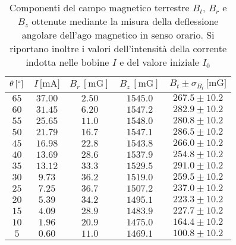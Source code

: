 \documentclass[]{article}
\begin{document}
\begin{table}
    \centering


\begin{tabular}{||c|c|c|c|c||}
    \hline
    $\theta\, [\text{\degree}] $ & $I\, \text{[mA]} $ & $B_r\, [\text{mG}] $ & $B_z\, [\text{mG}] $ & $B_t \pm \sigma_{B_t}\, \text{[mG]} $\\
    \hline\hline

    $65$ & $37.00$ & $2.50$ & $1545.0$ & $267.5 \pm 10.2$ \\\hline
    $60$ & $31.45$ & $6.20$ & $1547.2$ & $282.9 \pm 10.2$ \\\hline
    $55$ & $25.65$ & $11.0$ & $1548.0$ & $280.8 \pm 10.2$ \\\hline
    $50$ & $21.79$ & $16.7$ & $1547.1$ & $286.5 \pm 10.2$ \\\hline
    $45$ & $16.98$ & $22.8$ & $1543.8$ & $266.0 \pm 10.2$ \\\hline
    $40$ & $13.69$ & $28.6$ & $1537.9$ & $254.8 \pm 10.2$ \\\hline
    $35$ & $13.12$ & $33.3$ & $1529.5$ & $291.0 \pm 10.2$ \\\hline
    $30$ & $ 9.73$ & $36.2$ & $1519.0$ & $259.5 \pm 10.2$ \\\hline
    $25$ & $ 7.25$ & $36.7$ & $1507.2$ & $237.0 \pm 10.2$ \\\hline
    $20$ & $ 5.39$ & $34.2$ & $1495.1$ & $223.3 \pm 10.2$ \\\hline
    $15$ & $ 4.09$ & $28.9$ & $1483.9$ & $227.7 \pm 10.2$ \\\hline
    $10$ & $ 1.96$ & $20.9$ & $1475.0$ & $164.4 \pm 10.2$ \\\hline
    $5 $ & $ 0.60$ & $11.0$ & $1469.1$ & $100.8 \pm 10.2$ \\\hline

\end{tabular}
\caption{Componenti del campo magnetico terrestre $B_t$, $B_r$ e $B_z$ ottenute mediante la misura della deflessione angolare dell'ago magnetico in senso orario. Si riportano inoltre i valori dell'intensità della corrente indotta nelle bobine $I$ e del valore iniziale $I_0$}
\label{campomagneticoterrestre_sensoorario}
\end{table}
\end{document}
